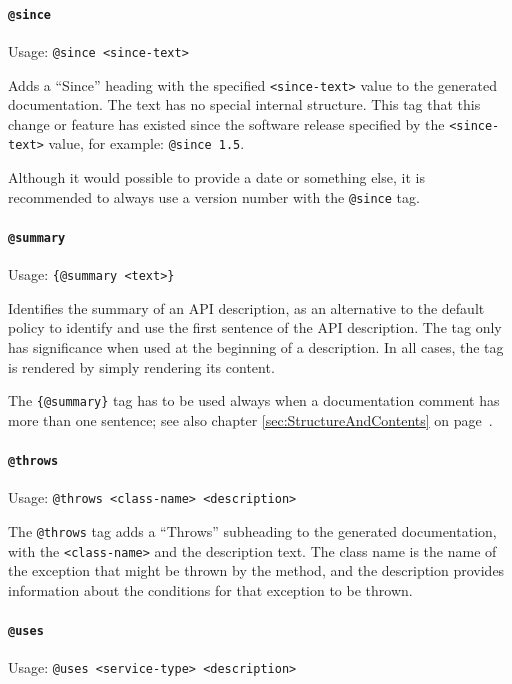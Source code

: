 \documentclass[11pt,a4paper, titlepage, parskip=half, headsepline, footsepline, cleardoublepage=current, headheight=1cm]{scrbook}
\newcommand*{\tqvref}[1]{\hyperref[{#1}]{\ref*{#1}} on page~\pageref{#1}}
\begin{document}
\paragraph{\lstinline|@since|}\label{sec:TagSince}  Usage: \lstinline|@since <since-text>|

Adds a “Since” heading with the specified \verb#<since-text># value to the generated documentation. The text has no special internal structure. This tag that this change or feature has existed since the software release specified by the \verb#<since-text># value, for example: \lstinline|@since 1.5|.

Although it would possible to provide a date or something else, it is recommended to always use a version number with the \lstinline|@since| tag.

\paragraph{\lstinline|@summary|}\label{sec:TagSummary}  Usage:  \lstinline|{@summary <text>}|

Identifies  the summary of an API description, as an alternative to the default policy to identify and use the first sentence of the API description. The tag only has significance when used at the beginning of a description. In all cases, the tag is rendered by simply rendering its content.

The \lstinline|{@summary}| tag has to be used always when a documentation comment has more than one sentence; see also chapter \tqvref{sec:StructureAndContents}.

\paragraph{\lstinline|@throws|}\label{sec:TagThrows}  Usage: \lstinline|@throws <class-name> <description>|

The \lstinline|@throws| tag adds a “Throws” subheading to the generated documentation, with the \verb#<class-name># and the description text. The class name is the name of the exception that might be thrown by the method, and the description provides information about the conditions for that exception to be thrown. 

\paragraph{\lstinline|@uses|}\label{sec:TagUses}  Usage: \lstinline|@uses <service-type> <description>|
\end{document}
